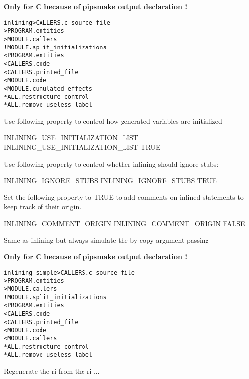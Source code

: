 \documentclass[a4paper]{report}
\newenvironment{PipsMake}{\begin{alltt}}{\end{alltt}}
\newenvironment{PipsPass}[1]{\label{pass:#1}}{}
\begin{document}
\textbf{Only for C because of pipsmake output declaration !}
\begin{PipsMake}
inlining      > CALLERS.c_source_file
              > PROGRAM.entities
              > MODULE.callers
		! MODULE.split_initializations
        < PROGRAM.entities
        < CALLERS.code
        < CALLERS.printed_file
		< MODULE.code
        < MODULE.cumulated_effects
        * ALL.restructure_control
		* ALL.remove_useless_label
\end{PipsMake}

Use following property to control how generated variables are initialized
\begin{PipsProp}{INLINING_USE_INITIALIZATION_LIST}
INLINING_USE_INITIALIZATION_LIST TRUE
\end{PipsProp}

Use following property to control whether inlining should ignore stubs:
\begin{PipsProp}{INLINING_IGNORE_STUBS}
INLINING_IGNORE_STUBS TRUE
\end{PipsProp}


Set the following property to TRUE to add comments on inlined statements to
keep track of their origin.
\begin{PipsProp}{INLINING_COMMENT_ORIGIN}
INLINING_COMMENT_ORIGIN FALSE
\end{PipsProp}

\begin{PipsPass}{inlining_simple}
Same as inlining but always simulate the by-copy argument passing
\end{PipsPass}

\textbf{Only for C because of pipsmake output declaration !}
\begin{PipsMake}
inlining_simple      > CALLERS.c_source_file
                     > PROGRAM.entities
                     > MODULE.callers
		! MODULE.split_initializations
        < PROGRAM.entities
        < CALLERS.code
        < CALLERS.printed_file
		< MODULE.code
        < MODULE.callers
        * ALL.restructure_control
		* ALL.remove_useless_label
\end{PipsMake}

\begin{PipsPass}{recompile_module}
Regenerate the ri from the ri ...
\end{PipsPass}
\end{document}
